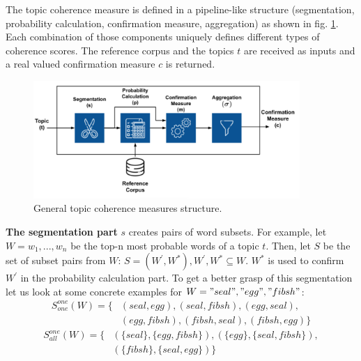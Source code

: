 The topic coherence measure is defined in a pipeline-like structure (segmentation, probability calculation, confirmation measure, aggregation) as shown in fig. \ref{fig:tcm}. Each combination of those components uniquely defines different types of coherence scores. The reference corpus and the topics $t$ are received as inputs and a real valued confirmation measure $c$ is returned. 
\begin{figure}[H]
    \centering
    \includegraphics[width=0.9\textwidth]{figures/topiccoherence}
    \caption{General topic coherence measures structure. \cite{topiccoherencemeasures}}
    \label{fig:tcm}
\end{figure}
\textbf{The segmentation part} $s$ creates pairs of word subsets. For example, let $W={w_1,...,w_n}$ be the top-n most probable words of a topic $t$. Then, let $S$ be the set of subset pairs from $W$: $S={(W^{'},W^{*}),W^{'},W^{*}\subseteq W}$. $W^{*}$ is used to confirm $W^{'}$ in the probability calculation part. To get a better grasp of this segmentation let us look at some concrete examples for $W={"seal","egg","fibsh"}$:
\begin{equation}
    \begin{split}
        S^{one}_{one}(W)=\{&(seal,egg),(seal,fibsh),(egg,seal),\\
        & (egg,fibsh),(fibsh,seal),(fibsh,egg)\}
    \end{split}
\end{equation}
\begin{equation}
    \begin{split}
        S^{one}_{all}(W)=\{&(\{seal\},\{egg,fibsh\}),(\{egg\},\{seal,fibsh\}),\\
        & (\{fibsh\},\{seal,egg\})\}
    \end{split}
\end{equation}

